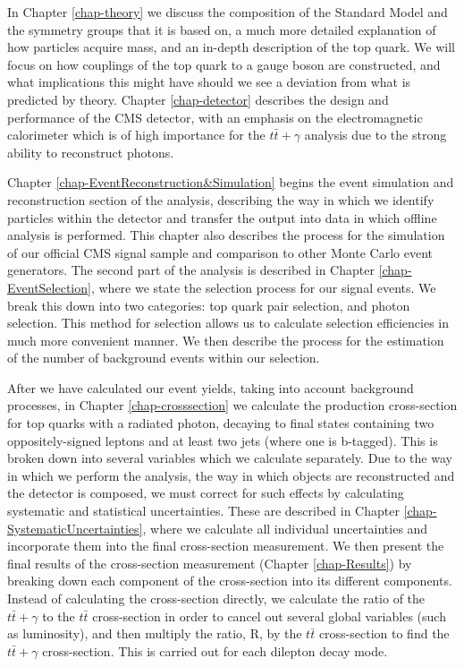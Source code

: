 In Chapter \ref{chap-theory} we discuss the composition of the Standard Model and the symmetry groups that it is based on, a much more detailed explanation of how particles acquire mass, and an in-depth description of the top quark. We will focus on how couplings of the top quark to a gauge boson are constructed, and what implications this might have should we see a deviation from what is predicted by theory. Chapter \ref{chap-detector} describes the design and performance of the CMS detector, with an emphasis on the electromagnetic calorimeter which is of high importance for the $t\bar{t}+\gamma$ analysis due to the strong ability to reconstruct photons. 

Chapter \ref{chap-EventReconstruction&Simulation} begins the event simulation and reconstruction section of the analysis, describing the way in which we identify particles within the detector and transfer the output into data in which offline analysis is performed. This chapter also describes the process for the simulation of our official CMS signal sample and comparison to other Monte Carlo event generators. The second part of the analysis is described in Chapter \ref{chap-EventSelection}, where we state the selection process for our signal events. We break this down into two categories: top quark pair selection, and photon selection. This method for selection allows us to calculate selection efficiencies in much more convenient manner. We then describe the process for the estimation of the number of background events within our selection. 

After we have calculated our event yields, taking into account background processes, in Chapter \ref{chap-crosssection} we calculate the production cross-section for top quarks with a radiated photon, decaying to final states containing two oppositely-signed leptons and at least two jets (where one is b-tagged). This is broken down into several variables which we calculate separately. Due to the way in which we perform the analysis, the way in which objects are reconstructed and the detector is composed, we must correct for such effects by calculating systematic and statistical uncertainties. These are described in Chapter \ref{chap-SystematicUncertainties}, where we calculate all individual uncertainties and incorporate them into the final cross-section measurement. We then present the final results of the cross-section measurement (Chapter \ref{chap-Results}) by breaking down each component of the cross-section into its different components. Instead of calculating the cross-section directly, we calculate the ratio of the $t\bar{t}+\gamma$ to the $t\bar{t}$ cross-section in order to cancel out several global variables (such as luminosity), and then multiply the ratio, R, by the $t\bar{t}$ cross-section to find the $t\bar{t}+\gamma$ cross-section. This is carried out for each dilepton decay mode.


